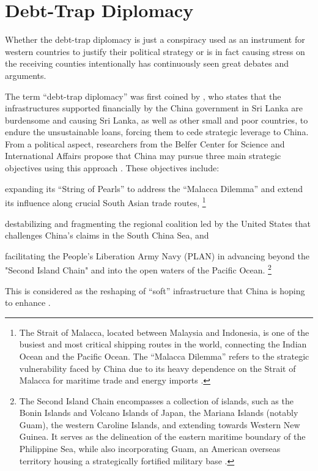 \section{Debt-Trap Diplomacy}
Whether the debt-trap diplomacy is just a conspiracy used as an instrument for western countries to justify their political strategy or is in fact causing stress on the receiving counties intentionally has continuously seen great debates and arguments.

The term ``debt-trap diplomacy'' was first coined by \citet{Chellaney_2017}, who states that the infrastructures supported financially by the China government in Sri Lanka are burdensome and causing Sri Lanka, as well as other small and poor countries, to endure the unsustainable loans, forcing them to cede strategic leverage to China.
From a political aspect,
researchers from the Belfer Center for Science and International Affairs propose that China may pursue three main strategic objectives using this approach \citep*{Parker2018}.
These objectives include:
\begin{enumerate*}[label = (\roman*)]
    \item expanding its ``String of Pearls'' to address the ``Malacca Dilemma'' and extend its influence along crucial South Asian trade routes,%
    \footnote{
        The Strait of Malacca, located between Malaysia and Indonesia, is one of the busiest and most critical shipping routes in the world, connecting the Indian Ocean and the Pacific Ocean.
        The ``Malacca Dilemma'' refers to the strategic vulnerability faced by China due to its heavy dependence on the Strait of Malacca for maritime trade and energy imports \citep*{Parker2018}.
    }
    \item destabilizing and fragmenting the regional coalition led by the United States that challenges China's claims in the South China Sea, and
    \item facilitating the People's Liberation Army Navy (PLAN) in advancing beyond the "Second Island Chain" and into the open waters of the Pacific Ocean.%
    \footnote{
        The Second Island Chain encompasses a collection of islands, such as the Bonin Islands and Volcano Islands of Japan, the Mariana Islands (notably Guam), the western Caroline Islands, and extending towards Western New Guinea. It serves as the delineation of the eastern maritime boundary of the Philippine Sea, while also incorporating Guam, an American overseas territory housing a strategically fortified military base
        \citep{Vorndick-Island-chian-18}.
    }
\end{enumerate*}
This is considered as the reshaping of ``soft'' infrastructure that China is hoping to enhance \citep{Jonathan-Hillman-18}.

